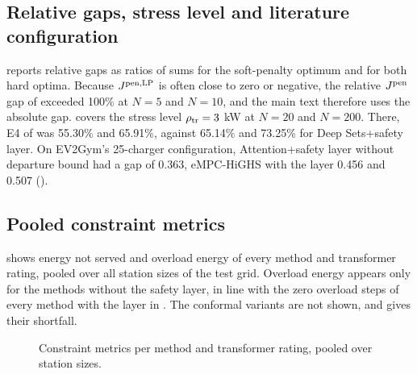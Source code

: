 
\subsection{Relative gaps, stress level and literature configuration}\label{app:res-sensitivity}

 reports relative gaps as ratios of sums for the soft-penalty optimum and for both hard optima.
Because $J^{\mathrm{pen,LP}}$ is often close to zero or negative, the relative $J^{\mathrm{pen}}$ gap of \method{} exceeded 100\% at $N=5$ and $N=10$, and the main text therefore uses the absolute gap.
 covers the stress level $\rho_{\mathrm{tr}}=3$ kW at $N=20$ and $N=200$.
There, E4 of \method{} was 55.30\% and 65.91\%, against 65.14\% and 73.25\% for Deep Sets+safety layer.
On EV2Gym's 25-charger configuration, Attention+safety layer without departure bound had a gap of 0.363, eMPC-HiGHS with the layer 0.456 and \method{} 0.507 ().


\subsection{Pooled constraint metrics}\label{app:res-example}

 shows energy not served and overload energy of every method and transformer rating, pooled over all station sizes of the test grid.
Overload energy appears only for the methods without the safety layer, in line with the zero overload steps of every method with the layer in .
The conformal variants are not shown, and  gives their shortfall.

\begin{figure}[t]
\centering
{}
\caption{Constraint metrics per method and transformer rating, pooled over station sizes.}
\label{fig:constraintspooled}
\end{figure}
